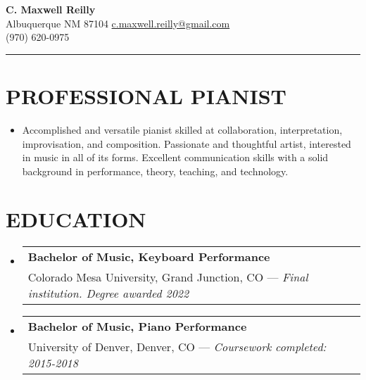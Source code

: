 \documentclass{article}
\makeatletter
\newcommand{\resumeSubHeadingListStart}{\begin{itemize}[leftmargin=0pt]}
\newcommand{\resumeSubHeadingListEnd}{\end{itemize}}
\newcommand{\resumeEducationSubheading}[3]{
        \vspace{-1pt}\item[]
            \begin{tabular*}{1\textwidth}[t]{l@{\extracolsep{\fill}}r}
                \textbf{#1} \\ %
                {#2} %
                { --- \em #3} \\ %
            \end{tabular*}
    }
\makeatother
\begin{document}
    \begin{center}
        \textbf{\Large C. Maxwell Reilly} \\ Albuquerque NM 87104
        \href{mailto:c.maxwell.reilly@gmail.com}{  c.maxwell.reilly@gmail.com}
        \\ (970) 620-0975
    \end{center}\vspace{-11pt}
    \rule{\textwidth}{1pt}

    \section{PROFESSIONAL PIANIST}
        \resumeSubHeadingListStart
            \item []
                Accomplished and versatile pianist skilled at
                collaboration, interpretation, improvisation, and
                composition. Passionate and thoughtful artist, interested
                in music in all of its forms. Excellent communication
                skills with a solid background in performance, theory,
                teaching, and technology.
        \resumeSubHeadingListEnd

    \section{EDUCATION}
        \resumeSubHeadingListStart
            \resumeEducationSubheading
                {Bachelor of Music, Keyboard Performance}
                {Colorado Mesa University, Grand Junction, CO}
                {Final institution. Degree awarded 2022}
            \resumeEducationSubheading
                {Bachelor of Music, Piano Performance}
                {University of Denver, Denver, CO}
                {Coursework completed: 2015-2018}
        \resumeSubHeadingListEnd
\end{document}
